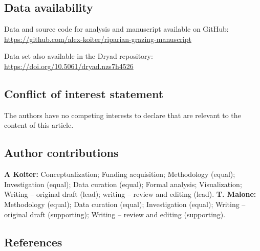 \documentclass[
]{agujournal2019}
\begin{document}
\subsection*{Data availability}\label{data-availability}

Data and source code for analysis and manuscript available on GitHub:
\url{https://github.com/alex-koiter/riparian-grazing-manuscript}

Data set also available in the Dryad repository:
\url{https://doi.org/10.5061/dryad.nzs7h4526}

\subsection*{Conflict of interest
statement}\label{conflict-of-interest-statement}

The authors have no competing interests to declare that are relevant to
the content of this article.

\subsection*{Author contributions}\label{author-contributions}

\textbf{A Koiter:} Conceptualization; Funding acquisition; Methodology
(equal); Investigation (equal); Data curation (equal); Formal analysis;
Visualization; Writing -- original draft (lead); writing -- review and
editing (lead). \textbf{T. Malone:} Methodology (equal); Data curation
(equal); Investigation (equal); Writing -- original draft (supporting);
Writing -- review and editing (supporting).

\subsection*{References}\label{references}
\end{document}
